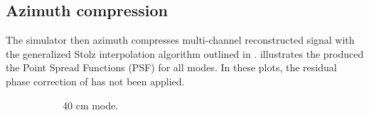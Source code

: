 \subsection{Azimuth compression}
The simulator then azimuth compresses multi-channel reconstructed signal with the generalized Stolz interpolation algorithm outlined in .  illustrates the produced the Point Spread Functions (PSF) for all modes. In these plots, the residual phase correction of  has not been applied.
\begin{figure}[ht!]
\begin{subfigure}{0.5\textwidth}
\begin{center}
 \caption{40 cm mode.}
 \label{fg:40cmPSF}
 \end{center}
\end{subfigure}
\begin{subfigure}{0.5\textwidth}
\begin{center}

\end{center}
\end{subfigure}
\end{figure}
